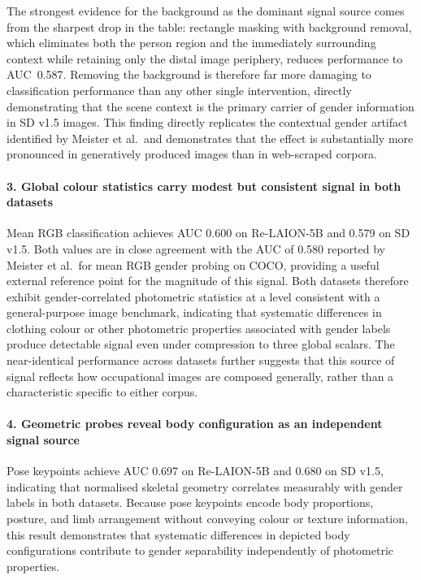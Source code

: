 The strongest evidence for the background as the dominant signal source comes from
the sharpest drop in the table: rectangle masking with background removal, which
eliminates both the person region and the immediately surrounding context while
retaining only the distal image periphery, reduces performance to AUC~0.587. Removing
the background is therefore far more damaging to classification performance than
any other single intervention, directly demonstrating that the scene context is the
primary carrier of gender information in SD v1.5 images. This finding directly replicates
the contextual gender artifact identified by Meister et al.\ and demonstrates that the
effect is substantially more pronounced in generatively produced images than in
web-scraped corpora.

\paragraph{3. Global colour statistics carry modest but consistent signal in both datasets}

Mean RGB classification achieves AUC 0.600 on Re-LAION-5B and 0.579 on SD v1.5. Both
values are in close agreement with the AUC of 0.580 reported by Meister et al.\ for mean
RGB gender probing on COCO, providing a useful external reference point for the magnitude
of this signal. Both datasets therefore exhibit gender-correlated photometric statistics
at a level consistent with a general-purpose image benchmark, indicating that systematic
differences in clothing colour or other photometric properties associated with gender
labels produce detectable signal even under compression to three global scalars. The
near-identical performance across datasets further suggests that this source of signal
reflects how occupational images are composed generally, rather than a characteristic
specific to either corpus.

\paragraph{4. Geometric probes reveal body configuration as an independent signal source}

Pose keypoints achieve AUC 0.697 on Re-LAION-5B and 0.680 on SD v1.5, indicating that
normalised skeletal geometry correlates measurably with gender labels in both datasets.
Because pose keypoints encode body proportions, posture, and limb arrangement without
conveying colour or texture information, this result demonstrates that systematic
differences in depicted body configurations contribute to gender separability
independently of photometric properties.


